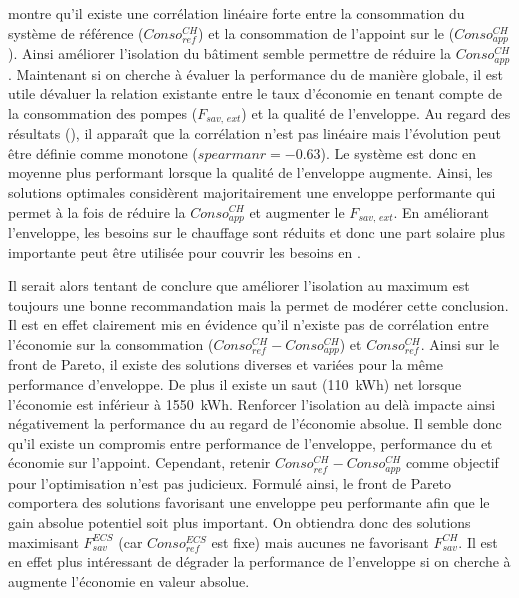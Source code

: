  montre qu’il existe une corrélation linéaire forte entre la
consommation du système de référence ($Conso_{ref}^{CH}$) et la consommation de l’appoint sur
le  ($Conso_{app}^{CH}$). Ainsi améliorer l’isolation du bâtiment semble permettre
de réduire la $Conso_{app}^{CH}$. Maintenant si on cherche à évaluer la performance du
 de manière globale, il est utile dévaluer la relation existante entre
le taux d’économie en tenant compte de la consommation des pompes ($F_{sav,\,ext}$)
et la qualité de l’enveloppe. Au regard des résultats (),
il apparaît que la corrélation n’est pas linéaire mais l’évolution peut être définie
comme monotone ($spearmanr = \num{-0.63}$). Le système est donc en moyenne plus performant
lorsque la qualité de l’enveloppe augmente. Ainsi, les solutions optimales
considèrent majoritairement une enveloppe performante qui permet à la fois de réduire
la $Conso_{app}^{CH}$ et augmenter le $F_{sav,\,ext}$. En améliorant l’enveloppe, les besoins
sur le chauffage sont réduits et donc une part solaire plus importante peut être
utilisée pour couvrir les besoins en .

Il serait alors tentant de conclure que améliorer l’isolation au maximum est
toujours une bonne recommandation mais la  permet
de modérer cette conclusion. Il est en effet clairement mis en évidence
qu’il n’existe pas de corrélation entre l’économie sur la consommation
($Conso_{ref}^{CH} - Conso_{app}^{CH}$) et $Conso_{ref}^{CH}$. Ainsi sur le front de Pareto, il existe des solutions diverses
et variées pour la même performance d’enveloppe. De plus il existe un saut (\SI{110}{kWh})
net lorsque l’économie est inférieur à \SI{1550}{kWh}. Renforcer l’isolation
au delà impacte ainsi négativement la performance du  au regard de l’économie
absolue. Il semble donc qu’il existe un compromis entre performance de l’enveloppe,
performance du  et économie sur l’appoint.
Cependant, retenir $Conso_{ref}^{CH} - Conso_{app}^{CH}$ comme objectif
pour l’optimisation n’est pas judicieux. Formulé ainsi, le front de Pareto
comportera des solutions favorisant une enveloppe peu performante afin que le gain
absolue potentiel soit plus important. On obtiendra donc des solutions
maximisant $F_{sav}^{ECS}$ (car $Conso_{ref}^{ECS}$ est fixe) mais aucunes ne
favorisant $F_{sav}^{CH}$. Il est en effet plus intéressant de dégrader la performance
de l’enveloppe si on cherche à augmente l’économie en valeur absolue.


